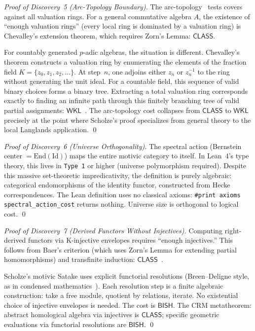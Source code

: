 \documentclass[11pt,a4paper]{article}
\theoremstyle{plain}
\theoremstyle{definition}
\newcommand{\BISH}{\textsf{BISH}}
\newcommand{\WKL}{\textsf{WKL}}
\newcommand{\CLASS}{\textsf{CLASS}}
\begin{document}
\begin{proof}[Proof of Discovery~5 (Arc-Topology Boundary)]
The arc-topology~\cite{scholze-berkovich} tests covers against all valuation rings. For a general commutative algebra $A$, the existence of ``enough valuation rings'' (every local ring is dominated by a valuation ring) is Chevalley's extension theorem, which requires Zorn's Lemma: $\CLASS$.

For countably generated $p$-adic algebras, the situation is different. Chevalley's theorem constructs a valuation ring by enumerating the elements of the fraction field $K = \{z_0, z_1, z_2, \ldots\}$. At step~$n$, one adjoins either $z_n$ or $z_n^{-1}$ to the ring without generating the unit ideal. For a countable field, this sequence of valid binary choices forms a binary tree. Extracting a total valuation ring corresponds exactly to finding an infinite path through this finitely branching tree of valid partial assignments: $\WKL$~\cite{simpson09}. The arc-topology cost collapses from $\CLASS$ to $\WKL$ precisely at the point where Scholze's proof specializes from general theory to the local Langlands application. \qed
\end{proof}

\begin{proof}[Proof of Discovery~6 (Universe Orthogonality)]
The spectral action (Bernstein center $= \mathrm{End}(\mathrm{Id})$) maps the entire motivic category to itself. In Lean~4's type theory, this lives in \texttt{Type 1} or higher (universe polymorphism required). Despite this massive set-theoretic impredicativity, the definition is purely algebraic: categorical endomorphisms of the identity functor, constructed from Hecke correspondences. The Lean definition uses no classical axioms: \texttt{\#print axioms spectral\_action\_cost} returns nothing. Universe size is orthogonal to logical cost. \qed
\end{proof}

\begin{proof}[Proof of Discovery~7 (Derived Functors Without Injectives)]
Computing right-derived functors via K-injective envelopes requires ``enough injectives.'' This follows from Baer's criterion (which uses Zorn's Lemma for extending partial homomorphisms) and transfinite induction: $\CLASS$~\cite{weibel94}.

Scholze's motivic Satake uses explicit functorial resolutions (Breen--Deligne style, as in condensed mathematics~\cite{scholze-condensed}). Each resolution step is a finite algebraic construction: take a free module, quotient by relations, iterate. No existential choice of injective envelopes is needed. The cost is $\BISH$. The CRM metatheorem: abstract homological algebra via injectives is $\CLASS$; specific geometric evaluations via functorial resolutions are $\BISH$. \qed
\end{proof}
\end{document}

